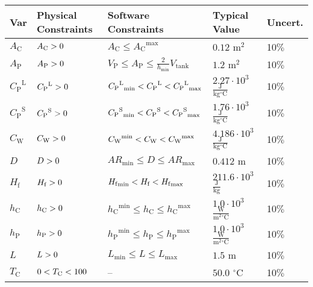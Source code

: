 \documentclass[12pt]{article}
\newcommand{\gt}{\ensuremath >}
\newcommand{\lt}{\ensuremath <}
\begin{document}
\begin{longtabu}{l l X[l] l l}
\toprule
\textbf{Var} & \textbf{Physical Constraints} & \textbf{Software Constraints} & \textbf{Typical Value} & \textbf{Uncert.}
\\
\midrule
\endhead
${A_{\text{C}}}$ & ${A_{\text{C}}}\gt{}0$ & ${A_{\text{C}}}\leq{}{{A_{\text{C}}}^{\text{max}}}$ & $0.12$ ${\text{m}^{2}}$ & 10$\%$
\\
${A_{\text{P}}}$ & ${A_{\text{P}}}\gt{}0$ & ${V_{\text{P}}}\leq{}{A_{\text{P}}}\leq{}\frac{2}{{h_{\text{min}}}} {V_{\text{tank}}}$ & $1.2$ ${\text{m}^{2}}$ & 10$\%$
\\
${{C_{\text{P}}}^{\text{L}}}$ & ${{C_{\text{P}}}^{\text{L}}}\gt{}0$ & ${{{C_{\text{P}}}^{\text{L}}}_{\text{min}}}\lt{}{{C_{\text{P}}}^{\text{L}}}\lt{}{{{C_{\text{P}}}^{\text{L}}}_{\text{max}}}$ & $2.27\cdot{}10^{3}$ $\frac{\text{J}}{\text{kg}{}^{\circ}\text{C}}$ & 10$\%$
\\
${{C_{\text{P}}}^{\text{S}}}$ & ${{C_{\text{P}}}^{\text{S}}}\gt{}0$ & ${{{C_{\text{P}}}^{\text{S}}}_{\text{min}}}\lt{}{{C_{\text{P}}}^{\text{S}}}\lt{}{{{C_{\text{P}}}^{\text{S}}}_{\text{max}}}$ & $1.76\cdot{}10^{3}$ $\frac{\text{J}}{\text{kg}{}^{\circ}\text{C}}$ & 10$\%$
\\
${C_{\text{W}}}$ & ${C_{\text{W}}}\gt{}0$ & ${{C_{\text{W}}}^{\text{min}}}\lt{}{C_{\text{W}}}\lt{}{{C_{\text{W}}}^{\text{max}}}$ & $4.186\cdot{}10^{3}$ $\frac{\text{J}}{\text{kg}{}^{\circ}\text{C}}$ & 10$\%$
\\
$D$ & $D\gt{}0$ & ${AR_{\text{min}}}\leq{}D\leq{}{AR_{\text{max}}}$ & $0.412$ ${\text{m}}$ & 10$\%$
\\
${H_{\text{f}}}$ & ${H_{\text{f}}}\gt{}0$ & ${{H_{\text{f}}}_{\text{min}}}\lt{}{H_{\text{f}}}\lt{}{{H_{\text{f}}}_{\text{max}}}$ & $211.6\cdot{}10^{3}$ $\frac{\text{J}}{\text{kg}}$ & 10$\%$
\\
${h_{\text{C}}}$ & ${h_{\text{C}}}\gt{}0$ & ${{h_{\text{C}}}^{\text{min}}}\leq{}{h_{\text{C}}}\leq{}{{h_{\text{C}}}^{\text{max}}}$ & $1.0\cdot{}10^{3}$ $\frac{\text{W}}{\text{m}^{2}{}^{\circ}\text{C}}$ & 10$\%$
\\
${h_{\text{P}}}$ & ${h_{\text{P}}}\gt{}0$ & ${{h_{\text{P}}}^{\text{min}}}\leq{}{h_{\text{P}}}\leq{}{{h_{\text{P}}}^{\text{max}}}$ & $1.0\cdot{}10^{3}$ $\frac{\text{W}}{\text{m}^{2}{}^{\circ}\text{C}}$ & 10$\%$
\\
$L$ & $L\gt{}0$ & ${L_{\text{min}}}\leq{}L\leq{}{L_{\text{max}}}$ & $1.5$ ${\text{m}}$ & 10$\%$
\\
${T_{\text{C}}}$ & $0\lt{}{T_{\text{C}}}\lt{}100$ & -- & $50.0$ ${{}^{\circ}\text{C}}$ & 10$\%$

\end{longtabu}
\end{document}
